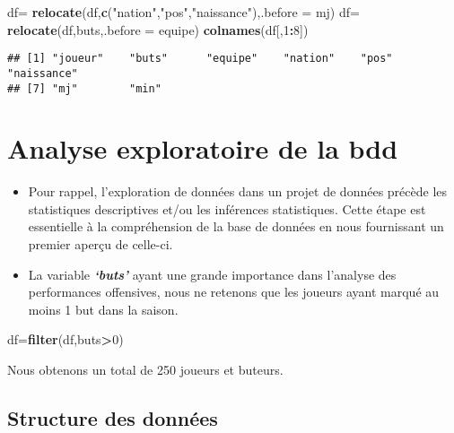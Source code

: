 \documentclass[7pt,]{report}
\newenvironment{Shaded}{\begin{snugshade}}{\end{snugshade}}
\newcommand{\DataTypeTok}[1]{\textcolor[rgb]{0.13,0.29,0.53}{#1}}
\newcommand{\DecValTok}[1]{\textcolor[rgb]{0.00,0.00,0.81}{#1}}
\newcommand{\KeywordTok}[1]{\textcolor[rgb]{0.13,0.29,0.53}{\textbf{#1}}}
\newcommand{\NormalTok}[1]{#1}
\newcommand{\OperatorTok}[1]{\textcolor[rgb]{0.81,0.36,0.00}{\textbf{#1}}}
\newcommand{\StringTok}[1]{\textcolor[rgb]{0.31,0.60,0.02}{#1}}
\begin{document}
\begin{Shaded}
\begin{Highlighting}[]
\NormalTok{df=}\StringTok{ }\KeywordTok{relocate}\NormalTok{(df,}\KeywordTok{c}\NormalTok{(}\StringTok{"nation"}\NormalTok{,}\StringTok{"pos"}\NormalTok{,}\StringTok{"naissance"}\NormalTok{),}\DataTypeTok{.before =}\NormalTok{ mj)}
\NormalTok{df=}\StringTok{ }\KeywordTok{relocate}\NormalTok{(df,buts,}\DataTypeTok{.before =}\NormalTok{ equipe)}
\KeywordTok{colnames}\NormalTok{(df[,}\DecValTok{1}\OperatorTok{:}\DecValTok{8}\NormalTok{])}
\end{Highlighting}
\end{Shaded}

\begin{verbatim}
## [1] "joueur"    "buts"      "equipe"    "nation"    "pos"       "naissance"
## [7] "mj"        "min"
\end{verbatim}

\hypertarget{analyse-exploratoire-de-la-bdd}{%
\chapter{Analyse exploratoire de la bdd}\label{analyse-exploratoire-de-la-bdd}}

\begin{itemize}
\item
  Pour rappel, l'exploration de données dans un projet de données précède les statistiques descriptives et/ou les inférences statistiques. Cette étape est essentielle à la compréhension de la base de données en nous fournissant un premier aperçu de celle-ci.
\item
  La variable \textbf{\emph{`buts'}} ayant une grande importance dans l'analyse des performances offensives, nous ne retenons que les joueurs ayant marqué au moins 1 but dans la saison.
\end{itemize}

\begin{Shaded}
\begin{Highlighting}[]
\NormalTok{df=}\KeywordTok{filter}\NormalTok{(df,buts}\OperatorTok{>}\DecValTok{0}\NormalTok{)}
\end{Highlighting}
\end{Shaded}

Nous obtenons un total de 250 joueurs et buteurs.

\hypertarget{structure-des-donnuxe9es}{%
\section{Structure des données}\label{structure-des-donnuxe9es}}
\end{document}
